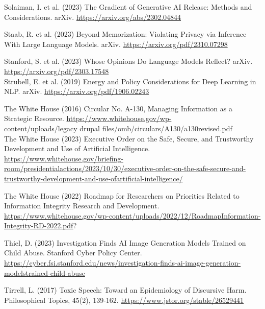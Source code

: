 \documentclass[10pt]{article}
\begin{document}
Solaiman, I. et al. (2023) The Gradient of Generative AI Release: Methods and Considerations. arXiv. \href{https://arxiv.org/abs/2302.04844}{https://arxiv.org/abs/2302.04844}

Staab, R. et al. (2023) Beyond Memorization: Violating Privacy via Inference With Large Language Models. arXiv. \href{https://arxiv.org/pdf/2310.07298}{https://arxiv.org/pdf/2310.07298}

Stanford, S. et al. (2023) Whose Opinions Do Language Models Reflect? arXiv.\\
\href{https://arxiv.org/pdf/2303.17548}{https://arxiv.org/pdf/2303.17548}\\
Strubell, E. et al. (2019) Energy and Policy Considerations for Deep Learning in NLP. arXiv. \href{https://arxiv.org/pdf/1906.02243}{https://arxiv.org/pdf/1906.02243}

The White House (2016) Circular No. A-130, Managing Information as a Strategic Resource. \href{https://www.whitehouse.gov/wp-}{https://www.whitehouse.gov/wp-}\\
content/uploads/legacy drupal files/omb/circulars/A130/a130revised.pdf\\
The White House (2023) Executive Order on the Safe, Secure, and Trustworthy Development and Use of Artificial Intelligence. \href{https://www.whitehouse.gov/briefing-room/presidentialactions/2023/10/30/executive-order-on-the-safe-secure-and-trustworthy-development-and-use-ofartificial-intelligence/}{https://www.whitehouse.gov/briefing-room/presidentialactions/2023/10/30/executive-order-on-the-safe-secure-and-trustworthy-development-and-use-ofartificial-intelligence/}

The White House (2022) Roadmap for Researchers on Priorities Related to Information Integrity Research and Development. \href{https://www.whitehouse.gov/wp-content/uploads/2022/12/RoadmapInformation-Integrity-RD-2022.pdf}{https://www.whitehouse.gov/wp-content/uploads/2022/12/RoadmapInformation-Integrity-RD-2022.pdf}?

Thiel, D. (2023) Investigation Finds AI Image Generation Models Trained on Child Abuse. Stanford Cyber Policy Center. \href{https://cyber.fsi.stanford.edu/news/investigation-finds-ai-image-generation-modelstrained-child-abuse}{https://cyber.fsi.stanford.edu/news/investigation-finds-ai-image-generation-modelstrained-child-abuse}

Tirrell, L. (2017) Toxic Speech: Toward an Epidemiology of Discursive Harm. Philosophical Topics, 45(2), 139-162. \href{https://www.jstor.org/stable/26529441}{https://www.jstor.org/stable/26529441}
\end{document}
